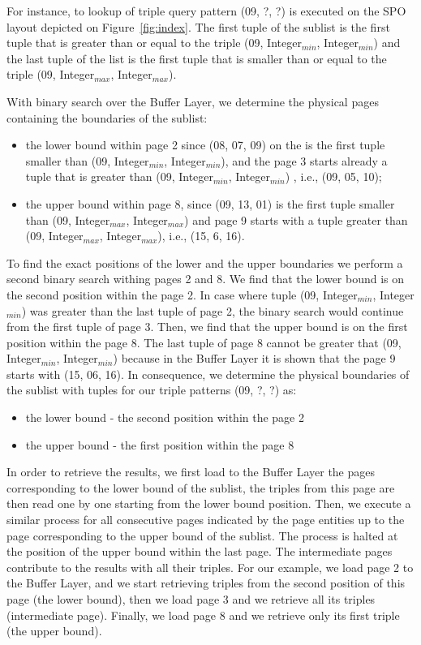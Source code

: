 For instance, to lookup of triple query pattern (09, ?, ?) is executed on the SPO layout depicted on Figure~\ref{fig:index}. The first tuple of the sublist is the first tuple that is greater than or equal to the triple (09, Integer$_{min}$, Integer$_{min}$) and the last tuple of the list is the first tuple that is smaller than or equal to the triple (09, Integer$_{max}$, Integer$_{max}$). 

With binary search over the Buffer Layer, we determine the physical pages containing the boundaries of the sublist:

\begin{itemize}
\item the lower bound within page 2 since (08, 07, 09) on the is the first tuple smaller than (09, Integer$_{min}$, Integer$_{min}$), and the page 3 starts already a tuple that is greater than (09, Integer$_{min}$, Integer$_{min}$) , i.e., (09, 05, 10);
\item the upper bound within page 8, since (09, 13, 01) is the first tuple smaller than  (09, Integer$_{max}$, Integer$_{max}$) and page 9 starts with a tuple greater than (09, Integer$_{max}$, Integer$_{max}$), i.e., (15, 6, 16). 
\end{itemize}

To find the exact positions of the lower and the upper boundaries we perform a second binary search withing pages 2 and 8. We find that the lower bound is on the second position within the  page 2. In case where tuple (09, Integer$_{min}$, Integer$_{min}$) was greater than the last tuple of page 2, the binary search would continue from the first tuple of page 3. Then, we find that the upper bound is on the first position within the  page 8. The last tuple of page 8 cannot be greater that (09, Integer$_{min}$, Integer$_{min}$) because in the Buffer Layer it is shown that the page 9 starts with (15, 06, 16). 
In consequence, we determine the physical boundaries of the sublist with tuples for our triple patterns (09, ?, ?) as: 

\begin{itemize}
\item the lower bound - the second position within the page 2
\item the upper bound - the first position within the page 8
\end{itemize}

In order to retrieve the results, we first load to the Buffer Layer the pages corresponding to the lower bound of the sublist, the triples from this page are then read one by one starting from the lower bound position. Then, we execute a similar process for all consecutive pages indicated by the page entities up to the page corresponding to the upper bound of the sublist. The process is halted at the position of the upper bound within the last page. The intermediate pages contribute to the results with all their triples. For our example, we load page 2 to the Buffer Layer, and we start retrieving triples from the second position of this page (the lower bound), then we load page 3 and we retrieve all its triples (intermediate page). Finally, we load page 8 and we retrieve only its first triple (the upper bound).


